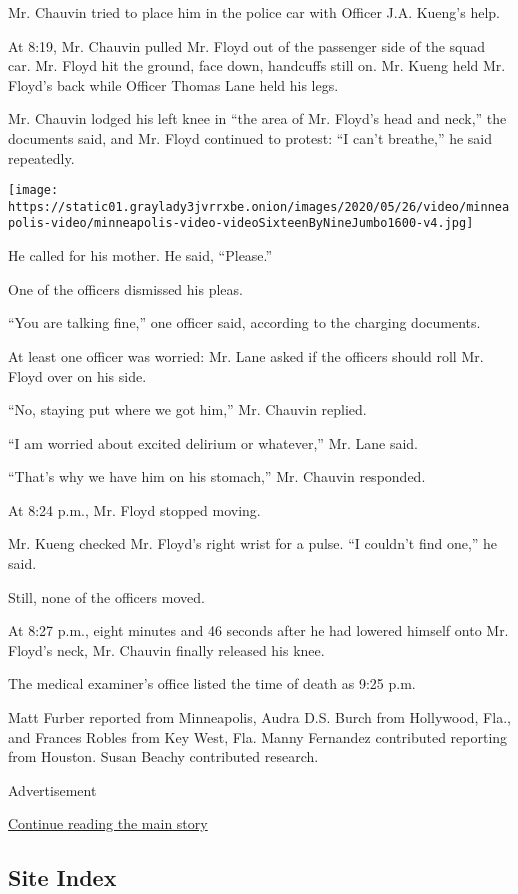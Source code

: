 Mr. Chauvin tried to place him in the police car with Officer J.A.
Kueng's help.

At 8:19, Mr. Chauvin pulled Mr. Floyd out of the passenger side of the
squad car. Mr. Floyd hit the ground, face down, handcuffs still on. Mr.
Kueng held Mr. Floyd's back while Officer Thomas Lane held his legs.

Mr. Chauvin lodged his left knee in ``the area of Mr. Floyd's head and
neck,'' the documents said, and Mr. Floyd continued to protest: ``I
can't breathe,'' he said repeatedly.

\texttt{[image: https://static01.graylady3jvrrxbe.onion/images/2020/05/26/video/minneapolis-video/minneapolis-video-videoSixteenByNineJumbo1600-v4.jpg]}

He called for his mother. He said, ``Please.''

One of the officers dismissed his pleas.

``You are talking fine,'' one officer said, according to the charging
documents.

At least one officer was worried: Mr. Lane asked if the officers should
roll Mr. Floyd over on his side.

``No, staying put where we got him,'' Mr. Chauvin replied.

``I am worried about excited delirium or whatever,'' Mr. Lane said.

``That's why we have him on his stomach,'' Mr. Chauvin responded.

At 8:24 p.m., Mr. Floyd stopped moving.

Mr. Kueng checked Mr. Floyd's right wrist for a pulse. ``I couldn't find
one,'' he said.

Still, none of the officers moved.

At 8:27 p.m., eight minutes and 46 seconds after he had lowered himself
onto Mr. Floyd's neck, Mr. Chauvin finally released his knee.

The medical examiner's office listed the time of death as 9:25 p.m.

Matt Furber reported from Minneapolis, Audra D.S. Burch from Hollywood,
Fla., and Frances Robles from Key West, Fla. Manny Fernandez contributed
reporting from Houston. Susan Beachy contributed research.

Advertisement

\protect\hyperlink{after-bottom}{Continue reading the main story}

\hypertarget{site-index}{%
\subsection{Site Index}\label{site-index}}

